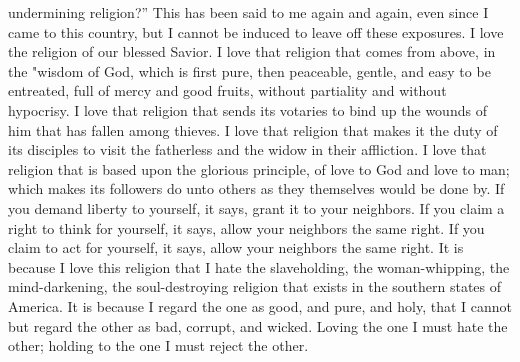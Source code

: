 undermining religion?'' This has been said to me again and again, even
since I came to this country, but I cannot be induced to leave off these
exposures. I love the religion of our blessed Savior. I love that
religion that comes from above, in the "wisdom of God, which is first
pure, then peaceable, gentle, and easy to be entreated, full of mercy
and good fruits, without partiality and without hypocrisy. I love that
religion that sends its votaries to bind up the wounds of him that has
fallen among thieves. I love that religion that makes it the duty of its
disciples to visit the fatherless and the widow in their affliction. I
love that religion that is based upon the glorious principle, of love to
God and love to man; which makes its followers do unto others as they
themselves would be done by. If you demand liberty to yourself, it says,
grant it to your neighbors. If you claim a right to think for yourself,
it says, allow your neighbors the same right. If you claim to act for
yourself, it says, allow your neighbors the same right. It is because I
love this religion that I hate the slaveholding, the woman-whipping, the
mind-darkening, the soul-destroying religion that exists in the southern
states of America. It is because I regard the one as good, and pure, and
holy, that I cannot but regard the other as bad, corrupt, and wicked.
Loving the one I must hate the other; holding to the one I must reject
the other.

